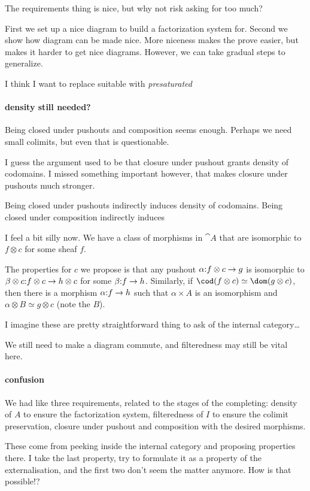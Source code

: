 \documentclass[csh.tex]{subfiles}
\begin{document}
The requirements thing is nice, but why not risk asking for too much?

First we set up a nice diagram to build a factorization system for. Second we show how diagram can be made nice. More niceness makes the prove easier, but makes it harder to get nice diagrams. However, we can take gradual steps to generalize.

I think I want to replace suitable with \emph{presaturated}


\paragraph{density still needed?}
Being closed under pushouts and composition seems enough. Perhaps we need small colimits, but even that is questionable.

I guess the argument used to be that closure under pushout grants density of codomains. I missed something important however, that makes closure under pushouts much stronger.

Being closed under pushouts indirectly induces density of codomains.
Being closed under composition indirectly induces 

I feel a bit silly now. We have a class of morphisms in $\cat A$ that are isomorphic to $f\otimes c$ for some sheaf $f$. 

The properties for $c$ we propose is that any pushout $\alpha\mathord : f\otimes c\to g$ is isomorphic to $\beta\otimes c\mathord : f\otimes c \to h\otimes c$ for some $\beta\mathord : f\to h$. Similarly, if $\cod(f\otimes c) \simeq \dom(g\otimes c)$, then there is a morphism $\alpha\mathord : f\to h$ such that $\alpha\times A$ is an isomorphism and $\alpha\otimes B\simeq g\otimes c$ (note the $B$).

I imagine these are pretty straightforward thing to ask of the internal category\dots

We still need to make a diagram commute, and filteredness may still be vital here.

\paragraph{confusion}
We had like three requirements, related to the stages of the completing:
density of $A$ to ensure the factorization system, 
filteredness of $I$ to ensure the colimit preservation,
closure under pushout and composition with the desired morphisms.

These come from peeking inside the internal category and proposing properties there.
I take the last property, try to formulate it as a property of the externalisation, and the first two don't seem the matter anymore.
How is that possible!?
\end{document}
